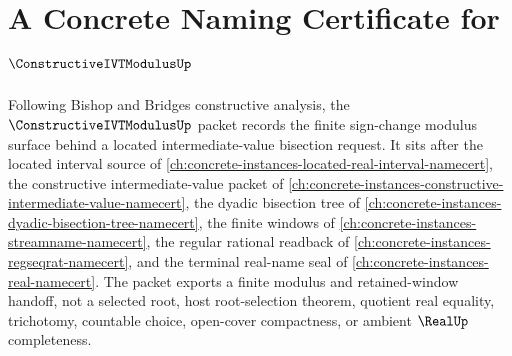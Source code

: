 \chapter{A Concrete Naming Certificate for $\ConstructiveIVTModulusUp$}
\label{ch:concrete-instances-constructive-ivt-modulus-namecert}

Following Bishop and Bridges constructive analysis, the $\ConstructiveIVTModulusUp$ packet records the finite sign-change modulus surface behind a located intermediate-value bisection request. It sits after the located interval source of \autoref{ch:concrete-instances-located-real-interval-namecert}, the constructive intermediate-value packet of \autoref{ch:concrete-instances-constructive-intermediate-value-namecert}, the dyadic bisection tree of \autoref{ch:concrete-instances-dyadic-bisection-tree-namecert}, the finite windows of \autoref{ch:concrete-instances-streamname-namecert}, the regular rational readback of \autoref{ch:concrete-instances-regseqrat-namecert}, and the terminal real-name seal of \autoref{ch:concrete-instances-real-namecert}. The packet exports a finite modulus and retained-window handoff, not a selected root, host root-selection theorem, quotient real equality, trichotomy, countable choice, open-cover compactness, or ambient $\RealUp$ completeness.


